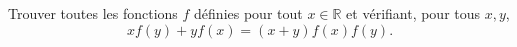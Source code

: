 Trouver toutes les fonctions $f$ définies pour tout $x \in \mathbb{R}$ et vérifiant, pour tous $x, y$,
\[ xf(y) + yf(x) = (x + y)f(x)f(y). \]
